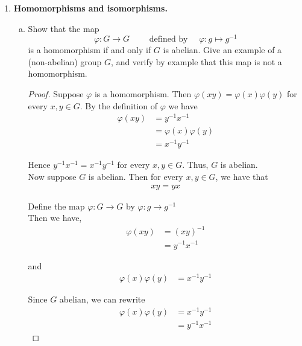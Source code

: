 \documentclass[11pt, reqno]{amsart}
\theoremstyle{plain}
\theoremstyle{definition}
\theoremstyle{example}
\begin{document}
\begin{enumerate}[1.]
\begin{proof}
Now for the other direction of the proof. Suppose $H \subset K$.\\

Then $\forall \; x \in H$ we have $x \in K$. Hence, $H \cup K = K$. Since $K \leqslant G$, we have $H \cup K \leqslant G$ as well.
\end{proof}

\item {\bf Homomorphisms and isomorphisms. }
\begin{enumerate}[(a)] 
\item Show that the map
$$\varphi: G \to G \qquad \text{ defined by } \quad  \varphi: g \mapsto g^{-1}$$ is a homomorphism if and only if $G$ is abelian. Give an example of a (non-abelian) group $G$, and verify by example that this map is not a homomorphism.

\begin{proof}
Suppose $\varphi$ is a homomorphism. Then $\varphi(xy) = \varphi(x)\varphi(y)$ for every $x, y \in G$. By the definition of $\varphi$ we have
\begin{align*}
\varphi(xy) &= y^{-1}x^{-1}\\
&= \varphi(x)\varphi(y)\\
&= x^{-1}y^{-1}
\end{align*}

Hence $y^{-1}x^{-1} = x^{-1}y^{-1}$ for every $x, y \in G$. Thus, $G$ is abelian.\\

Now suppose $G$ is abelian. Then for every $x, y \in G$, we have that
\begin{align*}
xy = yx
\end{align*}

Define the map $\varphi: G \to G$ by $\varphi: g \to g^{-1}$\\

Then we have,
\begin{align*}
\varphi(xy) &= (xy)^{-1}\\
&= y^{-1}x^{-1}
\end{align*}

and
\begin{align*}
\varphi(x)\varphi(y) &= x^{-1}y^{-1}
\end{align*}

Since $G$ abelian, we can rewrite 
\begin{align*}
\varphi(x)\varphi(y) &= x^{-1}y^{-1}\\
&= y^{-1}x^{-1}
\end{align*}


\end{proof}
\end{enumerate}
\end{enumerate}
\end{document}
